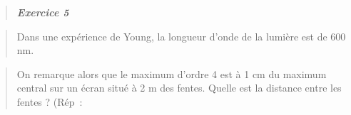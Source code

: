 \begin{quote}
\end{quote}

\begin{quote}
\end{quote}

\begin{quote}
\end{quote}

\begin{quote}
\end{quote}

\begin{quote}
\end{quote}

\begin{quote}
\end{quote}

\begin{quote}
\end{quote}

\begin{quote}
\end{quote}

\begin{quote}
\end{quote}

\begin{quote}
\end{quote}

\begin{quote}
\end{quote}

\begin{quote}
\emph{\textbf{Exercice 5}}
\end{quote}

\begin{quote}
Dans une expérience de Young, la longueur d'onde de la lumière est de
600 nm.
\end{quote}

\begin{quote}
On remarque alors que le maximum d'ordre 4 est à 1 cm du maximum central
sur un écran situé à 2 m des fentes. Quelle est la distance entre les
fentes\textbf{ }? (Rép~:
\end{quote}

\begin{quote}
\end{quote}

\begin{quote}
\end{quote}

